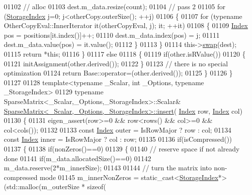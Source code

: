 \begin{DoxyCode}
01102     \textcolor{comment}{// alloc}
01103     dest.m\_data.resize(count);
01104     \textcolor{comment}{// pass 2}
01105     \textcolor{keywordflow}{for} (\hyperlink{group___sparse_core___module_a0b540ba724726ebe953f8c0df06081ed}{StorageIndex} j=0; j<otherCopy.outerSize(); ++j)
01106     \{
01107       \textcolor{keywordflow}{for} (\textcolor{keyword}{typename} OtherCopyEval::InnerIterator it(otherCopyEval, j); it; ++it)
01108       \{
01109         \hyperlink{group___core___module_a554f30542cc2316add4b1ea0a492ff02}{Index} pos = positions[it.index()]++;
01110         dest.m\_data.index(pos) = j;
01111         dest.m\_data.value(pos) = it.value();
01112       \}
01113     \}
01114     this->\hyperlink{endian_8c_a3ca5ecd34b04d6a243c054ac3a57f68d}{swap}(dest);
01115     \textcolor{keywordflow}{return} *\textcolor{keyword}{this};
01116   \}
01117   \textcolor{keywordflow}{else}
01118   \{
01119     \textcolor{keywordflow}{if}(other.isRValue())
01120     \{
01121       initAssignment(other.derived());
01122     \}
01123     \textcolor{comment}{// there is no special optimization}
01124     \textcolor{keywordflow}{return} Base::operator=(other.derived());
01125   \}
01126 \}
01127 
01128 \textcolor{keyword}{template}<\textcolor{keyword}{typename} \_Scalar, \textcolor{keywordtype}{int} \_Options, \textcolor{keyword}{typename} \_StorageIndex>
01129 \textcolor{keyword}{typename} SparseMatrix<\_Scalar,\_Options,\_StorageIndex>::Scalar& 
      \hyperlink{group___sparse_core___module_aae45e3b5fec7f6a0cdd10eec7c6d3666}{SparseMatrix<\_Scalar,\_Options,\_StorageIndex>::insert}(
      \hyperlink{group___core___module_a554f30542cc2316add4b1ea0a492ff02}{Index} row, \hyperlink{group___core___module_a554f30542cc2316add4b1ea0a492ff02}{Index} col)
01130 \{
01131   eigen\_assert(row>=0 && row<rows() && col>=0 && col<cols());
01132   
01133   \textcolor{keyword}{const} \hyperlink{group___core___module_a554f30542cc2316add4b1ea0a492ff02}{Index} outer = IsRowMajor ? row : col;
01134   \textcolor{keyword}{const} \hyperlink{group___core___module_a554f30542cc2316add4b1ea0a492ff02}{Index} inner = IsRowMajor ? col : row;
01135   
01136   \textcolor{keywordflow}{if}(isCompressed())
01137   \{
01138     \textcolor{keywordflow}{if}(nonZeros()==0)
01139     \{
01140       \textcolor{comment}{// reserve space if not already done}
01141       \textcolor{keywordflow}{if}(m\_data.allocatedSize()==0)
01142         m\_data.reserve(2*m\_innerSize);
01143       
01144       \textcolor{comment}{// turn the matrix into non-compressed mode}
01145       m\_innerNonZeros = \textcolor{keyword}{static\_cast<}\hyperlink{group___sparse_core___module_a0b540ba724726ebe953f8c0df06081ed}{StorageIndex}*\textcolor{keyword}{>}(std::malloc(m\_outerSize * \textcolor{keyword}{sizeof}(

\end{DoxyCode}
